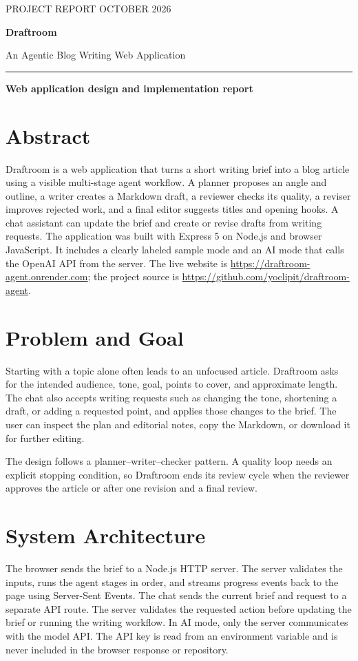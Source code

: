 \documentclass[10pt,letterpaper]{article}
\begin{document}
{\color{accent}\small PROJECT REPORT \hfill OCTOBER 2026}\par
\vspace{0.35em}
{\Huge\bfseries Draftroom}\par
{\Large An Agentic Blog Writing Web Application}\par
\vspace{0.45em}
\hrule
\vspace{0.7em}
\textbf{Web application design and implementation report}

\section*{Abstract}
Draftroom is a web application that turns a short writing brief into a blog article using a visible multi-stage agent workflow. A planner proposes an angle and outline, a writer creates a Markdown draft, a reviewer checks its quality, a reviser improves rejected work, and a final editor suggests titles and opening hooks. A chat assistant can update the brief and create or revise drafts from writing requests. The application was built with Express 5 on Node.js and browser JavaScript. It includes a clearly labeled sample mode and an AI mode that calls the OpenAI API from the server. The live website is \url{https://draftroom-agent.onrender.com}; the project source is \url{https://github.com/yoclipit/draftroom-agent}.

\section{Problem and Goal}
Starting with a topic alone often leads to an unfocused article. Draftroom asks for the intended audience, tone, goal, points to cover, and approximate length. The chat also accepts writing requests such as changing the tone, shortening a draft, or adding a requested point, and applies those changes to the brief. The user can inspect the plan and editorial notes, copy the Markdown, or download it for further editing.

The design follows a planner--writer--checker pattern. A quality loop needs an explicit stopping condition, so Draftroom ends its review cycle when the reviewer approves the article or after one revision and a final review.

\section{System Architecture}
The browser sends the brief to a Node.js HTTP server. The server validates the inputs, runs the agent stages in order, and streams progress events back to the page using Server-Sent Events. The chat sends the current brief and request to a separate API route. The server validates the requested action before updating the brief or running the writing workflow. In AI mode, only the server communicates with the model API. The API key is read from an environment variable and is never included in the browser response or repository.
\end{document}
